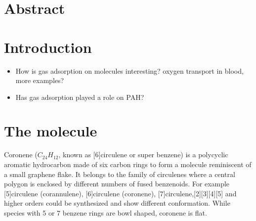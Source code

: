\label{section:HBBNC}
\label{section:HBC}
\section{Abstract}
\section{Introduction}
\begin{itemize}
	\item How is gas adsorption on molecules interesting?
		\subitem oxygen transport in blood, more examples?
	\item Has gas adsorption played a role on PAH?
\end{itemize}

\section{The molecule}
Coronene ($C_{24}H_{12}$, known as [6]circulene or super benzene) is a polycyclic aromatic hydrocarbon made of six carbon rings to form a molecule reminiscent of a small graphene flake. It belongs to the family of circulenes where a central polygon is enclosed by different numbers of fused benzenoids. For example [5]circulene (corannulene), [6]circulene (coronene), [7]circulene,[2][3][4][5] and higher orders could be synthesized and show different conformation. While species with 5 or 7 benzene rings are bowl shaped, coronene is flat.

